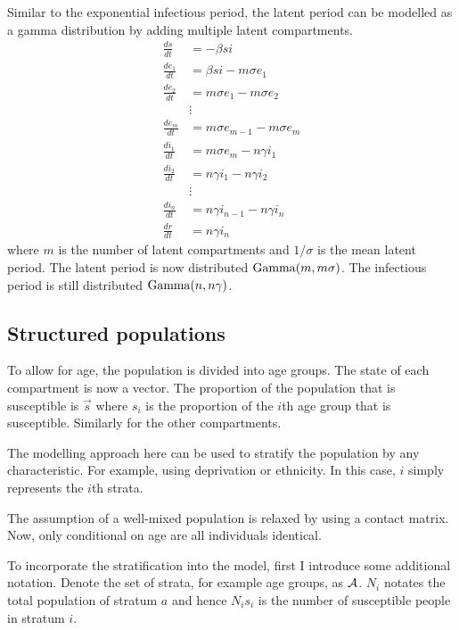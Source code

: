 \documentclass[thesis.tex]{subfiles}
\begin{document}
Similar to the exponential infectious period, the latent period can be modelled as a gamma distribution by adding multiple latent compartments.
\begin{align}
\frac{ds}{dt} &= -\beta si \\
\frac{de_1}{dt} &= \beta si - m\sigma e_1 \\
\frac{de_2}{dt} &= m\sigma e_1 - m \sigma e_2 \\
&\vdots \nonumber \\
\frac{de_m}{dt} &= m\sigma e_{m-1} - m \sigma e_m \\
\frac{di_1}{dt} &= m\sigma e_m - n\gamma i_1 \\
\frac{di_2}{dt} &= n\gamma i_1 - n \gamma i_2 \\
&\vdots \nonumber \\
\frac{di_n}{dt} &= n\gamma i_{n-1} - n \gamma i_n \\
\frac{dr}{dt} &= n\gamma i_n
\end{align}
where $m$ is the number of latent compartments and $1/\sigma$ is the mean latent period.
The latent period is now distributed $\operatorname{Gamma}(m, m\sigma)$.
The infectious period is still distributed $\operatorname{Gamma}(n, n\gamma)$.


\subsection{Structured populations} \label{SEIR:sec:structured-populations}


To allow for age, the population is divided into age groups.
The state of each compartment is now a vector.
The proportion of the population that is susceptible is $\vec{s}$ where $s_i$ is the proportion of the $i$th age group that is susceptible.
Similarly for the other compartments.

The modelling approach here can be used to stratify the population by any characteristic.
For example, using deprivation or ethnicity.
In this case, $i$ simply represents the $i$th strata.

The assumption of a well-mixed population is relaxed by using a contact matrix.
Now, only conditional on age are all individuals identical.

To incorporate the stratification into the model, first I introduce some additional notation.
Denote the set of strata, for example age groups, as $\mathcal{A}$. $N_i$ notates the total population of stratum $a$ and hence $N_i s_i$ is the number of susceptible people in stratum $i$.
\end{document}
